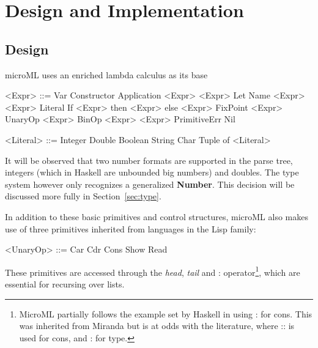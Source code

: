 \documentclass[12pt, a4paper]{report}
\begin{document}
\chapter{Design and Implementation}
\section{Design}
microML uses an enriched lambda calculus as its base
\vspace{5mm}

\begin{minipage}[t]{0.5\textwidth}
    \begin{grammar}
        <Expr> ::= Var
        \alt{} Constructor 
        \alt{} Application <Expr> <Expr>
        \alt{} Let Name <Expr> <Expr>
        \alt{} Literal 
        \alt{} If <Expr> then <Expr> else <Expr>
        \alt{} FixPoint <Expr>
        \alt{} UnaryOp <Expr>
        \alt{} BinOp <Expr> <Expr>
        \alt{} PrimitiveErr 
        \alt{} Nil
    \end{grammar}
\end{minipage}
\begin{minipage}[t]{0.5\textwidth}
    \begin{grammar}
        <Literal> ::= Integer
        \alt{} Double
        \alt{} Boolean
        \alt{} String
        \alt{} Char
        \alt{} Tuple of <Literal>
    \end{grammar}
\end{minipage}
\vspace{5mm}

It will be observed that two number formats are supported in the parse tree, integers (which in
Haskell are unbounded big numbers) and doubles. The type system however only recognizes a
generalized \textbf{Number}. This decision will be discussed more fully in Section~\ref{sec:type}.

In addition to these basic primitives and control structures, microML also makes use of three
primitives inherited from languages in the Lisp family:

\begin{grammar}
    <UnaryOp> ::= Car
    \alt{} Cdr
    \alt{} Cons
    \alt{} Show
    \alt{} Read
\end{grammar}

These primitives are accessed through the \textit{head}, \textit{tail} and :
operator\footnote{MicroML partially follows the example set by Haskell in using : for cons. This
was inherited from Miranda but is at odds with the literature, where :: is used for cons, and : for
type.}, which are essential for recursing over lists.
\end{document}
